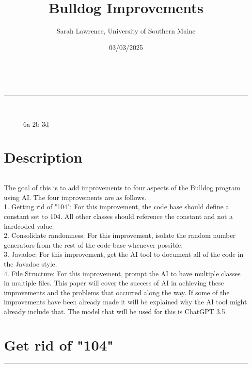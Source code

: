 \documentclass[a4paper,11pt]{article}
\makeatletter
\newcommand{\linia}{\rule{\linewidth}{0.5pt}}
\renewcommand{\maketitle}{
\begin{center}
\vspace{2ex}
{\huge \textsc{\@title}}
\vspace{1ex}
\\
\linia\\
\@author \hfill \@date
\vspace{4ex}
\end{center}
}
\makeatother
\begin{document}
\title{Bulldog Improvements}

\author{Sarah Lawrence, University of Southern Maine}

\date{03/03/2025}

\maketitle
\begin{figure}[h]
\centering
\Huge {}
{6a 2b 3d}
\end{figure}

\section*{Description}
\hrule
\vspace{13pt} %
The goal of this is to add improvements to four aspects of the Bulldog program using AI. The four improvements are as follows. \\
1. Getting rid of "104": For this improvement, the code base should define a constant set to 104. All other classes should reference the constant and not a hard\-coded value.\\
2. Consolidate randomness: For this improvement, isolate the random number generators from the rest of the code base whenever possible.\\
3. Javadoc: For this improvement, get the AI tool to document all of the code in the Javadoc style.\\
4. File Structure: For this improvement, prompt the AI to have multiple classes in multiple files. 
This paper will cover the success of AI in achieving these improvements and the problems that occurred along the way. If some of the improvements have been already made it will be explained why the AI tool might already include that. The model that will be used for this is ChatGPT 3.5.

\section*{Get rid of "104"}
\hrule
\vspace{13pt} %
\end{document}

